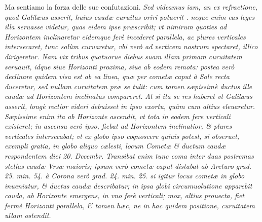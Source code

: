 \documentclass[11pt,twoside,openany]{book}
\begin{document}
\par\bigskip\noindent{}\enspace Ma sentiamo la forza delle sue confutazioni. \textit{Sed videamus iam, an ex refractione, quod Galilæus asserit, huius caudæ curuitas oriri potuerit . neque enim eas leges illa seruasse videtur, quas eidem ipse præscribit; vt nimirum quoties ad Horizontem inclinaretur eidemque ferè incederet parallela, ac plures verticales intersecaret, tunc solùm curuaretur, vbi verò ad verticem nostrum spectaret, illico }\textit{dirigeretur. Nam vix tribus quatuorue diebus suam illam primam curuitatem seruauit, idque siue Horizonti proxima, siue ab eodem remota: postea verò declinare quidem visa est ab ea linea, quæ per cometæ caput à Sole recta duceretur, sed nullam curuitatem præ se tulit: cum tamen sæpissimè ductus ille caudæ ad Horizontem inclinatus compareret. }\textit{At si ita se res haberet vt Galilæus asserit, longè rectior videri debuisset in ipso exortu, quàm cum altius eleuaretur. Sæpissime enim ita ab Horizonte ascendit, vt tota in eodem fere verticali existeret; in ascensu verò ipso, fiebat ad Horizontem inclinatior, \& plures verticales intersecabat; vt ex globo ipso cognoscere quiuis potest, si obseruet, exempli gratia, in globo aliquo cælesti, locum Cometæ \& ductum caudæ respondentem diei 20. Decembr. Transibat enim tunc coma inter duas postremas stellas caudæ Vrsæ maioris; ipsum verò cometæ caput distabat ab Arcturo grad. 25. min. 54. à Corona verò grad. 24. min. 25. si igitur locus cometæ in globo inueniatur, \& ductus caudæ describatur; in ipsa globi circumuolutione apparebit cauda, ab Horizonte emergens, in vno ferè verticali; mox, altius prouecta, fiet fermè Horizonti parallela, \& tamen hæc, ne in hac quidem positione, curuitatem ullam ostendit.}
\end{document}
